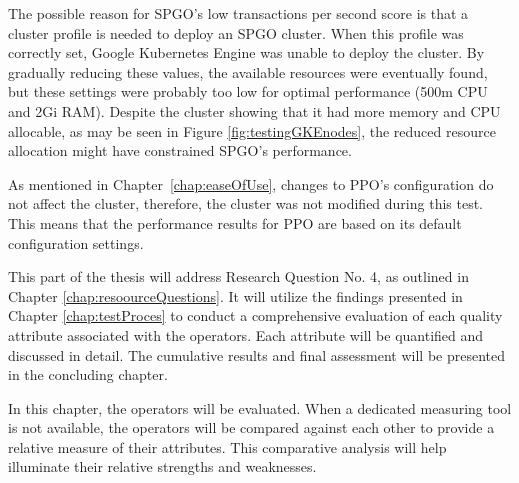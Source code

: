 The possible reason for SPGO's low transactions per second score is that a cluster profile is needed to deploy an SPGO cluster. When this profile was correctly set, Google Kubernetes Engine was unable to deploy the cluster. By gradually reducing these values, the available resources were eventually found, but these settings were probably too low for optimal performance (500m CPU and 2Gi RAM). Despite the cluster showing that it had more memory and CPU allocable, as may be seen in Figure \ref{fig:testingGKEnodes}, the reduced resource allocation might have constrained SPGO's performance.

As mentioned in Chapter~\ref{chap:easeOfUse}, changes to PPO's configuration do not affect the cluster, therefore, the cluster was not modified during this test. This means that the performance results for PPO are based on its default configuration settings.





This part of the thesis will address Research Question No. 4, as outlined in Chapter \ref{chap:resoourceQuestions}. It will utilize the findings presented in Chapter \ref{chap:testProces} to conduct a comprehensive evaluation of each quality attribute associated with the operators.
Each attribute will be quantified and discussed in detail.
The cumulative results and final assessment will be presented in the concluding chapter.

In this chapter, the operators will be evaluated. When a dedicated measuring tool is not available, the operators will be compared against each other to provide a relative measure of their attributes.
This comparative analysis will help illuminate their relative strengths and weaknesses.

